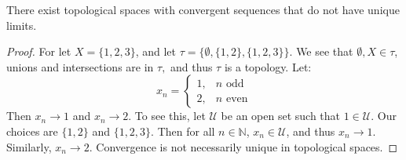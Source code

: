         \begin{theorem}
            There exist topological spaces with convergent sequences
            that do not have unique limits.
        \end{theorem}
        \begin{proof}
            For let $X=\{1,2,3\}$, and let
            $\tau=\{\emptyset, \{1,2\},\{1,2,3\}\}$. We see that
            $\emptyset,X\in \tau$, unions and intersections are
            in $\tau,$ and thus $\tau$ is a topology. Let:
            \begin{equation}
                x_{n}=
                \begin{cases}
                    1,&n\textrm{ odd}\\
                    2,&n\textrm{ even}
                \end{cases}
            \end{equation}
            Then $x_n \rightarrow 1$ and $x_n \rightarrow 2$. To
            see this, let $\mathcal{U}$ be an open set such that
            $1\in \mathcal{U}$. Our choices are $\{1,2\}$ and
            $\{1,2,3\}$. Then for all $n\in \mathbb{N}$,
            $x_{n}\in\mathcal{U}$, and thus $x_{n}\rightarrow{1}$.
            Similarly, $x_n \rightarrow 2$. Convergence is not
            necessarily unique in topological spaces.
        \end{proof}
